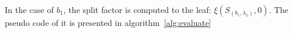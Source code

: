 In the case of $b_1$, the split factor is computed to the leaf: $\xi(S_{(b_1,\lambda_1)},0)$. The pseudo code of it is presented in algorithm~\ref{alg:evaluate}
%
%
%
%
%
%
